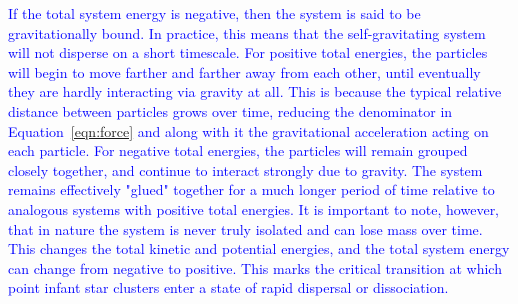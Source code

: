 \documentclass[main.tex]{subfiles}
\begin{document}
\begin{tcolorbox}[sharp corners, colback=blue!30, colframe=blue!80!blue, title=Gravitational Binding Energy]
\par \textcolor{blue} {If the total system energy is negative, then the system is said to be gravitationally bound.  In practice, this means that the self-gravitating system will not disperse on a short timescale.  For positive total energies, the particles will begin to move farther and farther away from each other, until eventually they are hardly interacting via gravity at all.  This is because the typical relative distance between particles grows over time, reducing the denominator in Equation~\ref{eqn:force} and along with it the gravitational acceleration acting on each particle.  For negative total energies, the particles will remain grouped closely together, and continue to interact strongly due to gravity.  The system remains effectively "glued" together for a much longer period of time relative to analogous systems with positive total energies.  It is important to note, however, that in nature the system is never truly isolated and can lose mass over time.  This changes the total kinetic and potential energies, and the total system energy can change from negative to positive.  This marks the critical transition at which point infant star clusters enter a state of rapid dispersal or dissociation.}
\end{tcolorbox}
\end{document}
